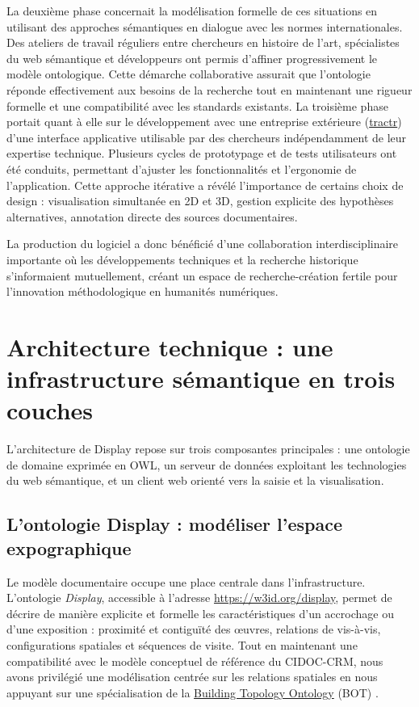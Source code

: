 \documentclass[fra, final]{anthology-ch}         %
\begin{document}
La deuxième phase concernait la modélisation formelle de ces situations en utilisant des approches sémantiques en dialogue avec les normes internationales. Des ateliers de travail réguliers entre chercheurs en histoire de l’art, spécialistes du web sémantique et développeurs ont permis d’affiner progressivement le modèle ontologique. Cette démarche collaborative assurait que l’ontologie réponde effectivement aux besoins de la recherche tout en maintenant une rigueur formelle et une compatibilité avec les standards existants. La troisième phase portait quant à elle sur le développement avec une entreprise extérieure (\href{https://www.tractr.net/}{tractr}) d’une interface applicative utilisable par des chercheurs indépendamment de leur expertise technique. Plusieurs cycles de prototypage et de tests utilisateurs ont été conduits, permettant d’ajuster les fonctionnalités et l’ergonomie de l’application. Cette approche itérative a révélé l’importance de certains choix de design : visualisation simultanée en 2D et 3D, gestion explicite des hypothèses alternatives, annotation directe des sources documentaires. 

La production du logiciel a donc bénéficié d’une collaboration interdisciplinaire importante où les développements techniques et la recherche historique s’informaient mutuellement, créant un espace de recherche-création fertile pour l’innovation méthodologique en humanités numériques.

\section{Architecture technique : une infrastructure sémantique en trois couches}

L’architecture de Display repose sur trois composantes principales : une ontologie de domaine exprimée en OWL, un serveur de données exploitant les technologies du web sémantique, et un client web orienté vers la saisie et la visualisation.

\subsection{L’ontologie Display : modéliser l’espace expographique}

Le modèle documentaire occupe une place centrale dans l’infrastructure. L’ontologie \textit{Display}, accessible à l’adresse \url{https://w3id.org/display}, permet de décrire de manière explicite et formelle les caractéristiques d’un accrochage ou d’une exposition : proximité et contiguïté des œuvres, relations de vis-à-vis, configurations spatiales et séquences de visite. Tout en maintenant une compatibilité avec le modèle conceptuel de référence du CIDOC-CRM, nous avons privilégié une modélisation centrée sur les relations spatiales \cite{abadie2019ontologie} en nous appuyant sur une spécialisation de la \href{https://w3c-lbd-cg.github.io/bot/}{Building Topology Ontology} (BOT) \cite{rasmussen2020bot,rasmussen2021bot,costin2022bim}.
\end{document}
